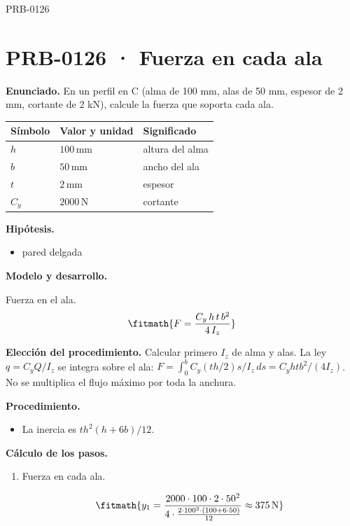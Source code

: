 \begin{studiumworked}{PRB-0126}

\section{PRB-0126 · Fuerza en cada ala}

\textbf{Enunciado.} En un perfil en C (alma de 100 mm, alas de 50 mm, espesor de 2 mm, cortante de 2 kN), calcule la fuerza que soporta cada ala.

\par\medskip\noindent\begin{tabular}{@{}p{.18\linewidth}p{.26\linewidth}p{.48\linewidth}@{}}
\toprule Símbolo & Valor y unidad & Significado\\\midrule
$h$ & $100\,\mathrm{mm}$ & altura del alma\\
$b$ & $50\,\mathrm{mm}$ & ancho del ala\\
$t$ & $2\,\mathrm{mm}$ & espesor\\
$C_{y}$ & $2000\,\mathrm{N}$ & cortante\\
\bottomrule\end{tabular}\par\medskip

\textbf{Hipótesis.}\begin{itemize}\item pared delgada\end{itemize}

\textbf{Modelo y desarrollo.}

Fuerza en el ala.\[\fitmath{F = \frac{C_y\,h\,t\,b^{2}}{4\,I_z}}\]

\textbf{Elección del procedimiento.} Calcular primero $I_z$ de alma y alas. La ley $q=C_yQ/I_z$ se integra sobre el ala: $F=\int_0^b C_y(th/2)s/I_z\,ds=C_yhtb^2/(4I_z)$. No se multiplica el flujo máximo por toda la anchura.

\textbf{Procedimiento.}\begin{itemize}\item La inercia es $t h^2 (h + 6b)/12$.\end{itemize}

\textbf{Cálculo de los pasos.}

\begin{enumerate}

\item Fuerza en cada ala.

\[\fitmath{y_{1}=\frac{2000\cdot 100\cdot 2\cdot {50}^{2}}{4\cdot \frac{2\cdot {100}^{2}\cdot \left(100+6\cdot 50\right)}{12}}\approx 375\,\mathrm{N}}\]


\end{enumerate}
\end{studiumworked}
